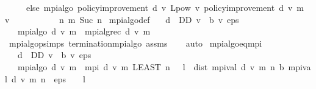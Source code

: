 \begin{isabellebody}
\ \ \ \ \ else\ mpi{\isacharunderscore}{\kern0pt}algo\ {\isacharparenleft}{\kern0pt}policy{\isacharunderscore}{\kern0pt}improvement\ d\ v{\isacharparenright}{\kern0pt}\ {\isacharparenleft}{\kern0pt}L{\isacharunderscore}{\kern0pt}pow\ v\ {\isacharparenleft}{\kern0pt}policy{\isacharunderscore}{\kern0pt}improvement\ d\ v{\isacharparenright}{\kern0pt}\ {\isacharparenleft}{\kern0pt}m\ {}\ v{\isacharparenright}{\kern0pt}{\isacharparenright}{\kern0pt}\isanewline
\ \ \ \ \ \ \ \ \ \ \ {\isacharparenleft}{\kern0pt}{\isasymlambda}n{\isachardot}{\kern0pt}\ m\ {\isacharparenleft}{\kern0pt}Suc\ n{\isacharparenright}{\kern0pt}{\isacharparenright}{\kern0pt}{\isacharparenright}{\kern0pt}{\isachardoublequoteclose}\isanewline
\isanewline
{}\isamarkupfalse%
\ mpi{\isacharunderscore}{\kern0pt}algo{\isacharunderscore}{\kern0pt}def{\isacharprime}{\kern0pt}{\isacharcolon}{\kern0pt}\isanewline
\ \ \ {\isachardoublequoteopen}d\ {\isasymin}\ D\isactrlsub D{\isachardoublequoteclose}\ {\isachardoublequoteopen}v\ {\isasymle}\ {\isasymL}\isactrlsub b\ v{\isachardoublequoteclose}\ {\isachardoublequoteopen}eps\ {\isachargreater}{\kern0pt}\ {}{\isachardoublequoteclose}\isanewline
\ \ \ {\isachardoublequoteopen}mpi{\isacharunderscore}{\kern0pt}algo\ d\ v\ m\ {\isacharequal}{\kern0pt}\ mpi{\isacharunderscore}{\kern0pt}alg{\isacharunderscore}{\kern0pt}rec\ d\ v\ m{\isachardoublequoteclose}\isanewline
%
\isadelimproof
\ \ %
\endisadelimproof
%
\isatagproof
{}\isamarkupfalse%
\ mpi{\isacharunderscore}{\kern0pt}algo{\isachardot}{\kern0pt}psimps\ termination{\isacharunderscore}{\kern0pt}mpi{\isacharunderscore}{\kern0pt}algo\ assms\isanewline
\ \ \isamarkupfalse%
\ auto%
\endisatagproof
{\isafoldproof}%
%
\isadelimproof
\isanewline
%
\endisadelimproof
\isanewline
{}\isamarkupfalse%
\ mpi{\isacharunderscore}{\kern0pt}algo{\isacharunderscore}{\kern0pt}eq{\isacharunderscore}{\kern0pt}mpi{\isacharcolon}{\kern0pt}\isanewline
\ \ \ {\isachardoublequoteopen}d\ {\isasymin}\ D\isactrlsub D{\isachardoublequoteclose}\ {\isachardoublequoteopen}v\ {\isasymle}\ {\isasymL}\isactrlsub b\ v{\isachardoublequoteclose}\ {\isachardoublequoteopen}eps\ {\isachargreater}{\kern0pt}\ {}{\isachardoublequoteclose}\isanewline
\ \ \ {\isachardoublequoteopen}mpi{\isacharunderscore}{\kern0pt}algo\ d\ v\ m\ {\isacharequal}{\kern0pt}\ mpi\ d\ v\ m\ {\isacharparenleft}{\kern0pt}LEAST\ n{\isachardot}{\kern0pt}\ {}\ {\isacharasterisk}{\kern0pt}\ l\ {\isacharasterisk}{\kern0pt}\ dist\ {\isacharparenleft}{\kern0pt}mpi{\isacharunderscore}{\kern0pt}val\ d\ v\ m\ n{\isacharparenright}{\kern0pt}\ {\isacharparenleft}{\kern0pt}{\isasymL}\isactrlsub b\ {\isacharparenleft}{\kern0pt}mpi{\isacharunderscore}{\kern0pt}val\ d\ v\ m\ n{\isacharparenright}{\kern0pt}{\isacharparenright}{\kern0pt}\ {\isacharless}{\kern0pt}\ eps\ {\isacharasterisk}{\kern0pt}\ {\isacharparenleft}{\kern0pt}{}\ {\isacharminus}{\kern0pt}\ l{\isacharparenright}{\kern0pt}{\isacharparenright}{\kern0pt}{\isachardoublequoteclose}\isanewline

\end{isabellebody}
